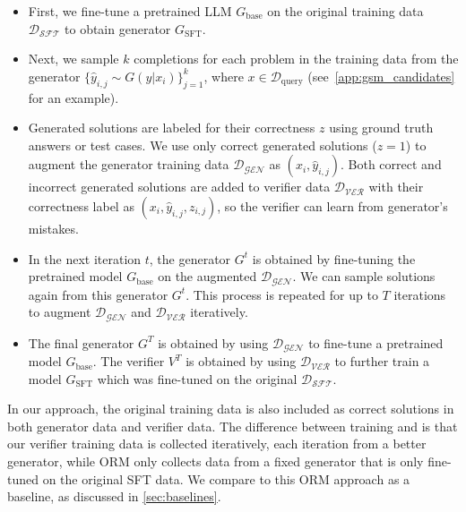 \begin{itemize}[left=0pt,itemsep=2pt,topsep=2pt]
\item First, we fine-tune a pretrained LLM $G_{\text{base}}$ on the original training data $\mathcal{D_\text{SFT}}$ to obtain generator $G_{\text{SFT}}$.  


\item Next, we sample $k$ completions for each problem in the training data from the generator $\{\hat{y}_{i,j} \sim G (y|x_i) \}_{j=1}^k$, where $x \in \mathcal{D}_
{\text{query}}$ (see~\autoref{app:gsm_candidates} for an example). 

\item Generated solutions are labeled for their correctness $z$ using ground truth answers or test cases. We use only correct generated solutions ($z=1$) to augment the generator training data $\mathcal{D_\text{GEN}}$ as $(x_i, \hat{y}_{i,j})$.
Both correct and incorrect generated solutions are added to verifier data $\mathcal{D_\text{VER}}$ with their correctness label  as $(x_i, \hat{y}_{i,j}, z_{i,j})$, so the verifier can learn from generator's mistakes. 

\item In the next iteration $t$, the generator $G^{t}$ is obtained by fine-tuning the pretrained model $G_{\text{base}}$ on the augmented $\mathcal{D_\text{GEN}}$. We can sample solutions again from this generator $G^{t}$. This process is repeated for up to $T$ iterations to augment $\mathcal{D_\text{GEN}}$ and $\mathcal{D_\text{VER}}$ iteratively. 

\item The final generator $G^T$ is obtained by using $\mathcal{D_\text{GEN}}$ to fine-tune a pretrained model $G_{\text{base}}$.
The verifier $V^T$ is obtained by using $\mathcal{D_\text{VER}}$ to further train a model $G_{\text{SFT}}$ which was fine-tuned on the original $\mathcal{D_\text{SFT}}$.

\end{itemize}

In our approach, the original training data is also included as correct solutions in both generator data and verifier data.
The difference between \vstar{} training and \citet{DBLP:journals/corr/abs-2110-14168} is that our verifier training data is collected iteratively, each iteration from a better generator, while ORM only collects data from a fixed generator that is only fine-tuned on the original SFT data. We compare to this ORM approach as a baseline, as discussed in \autoref{sec:baselines}.


